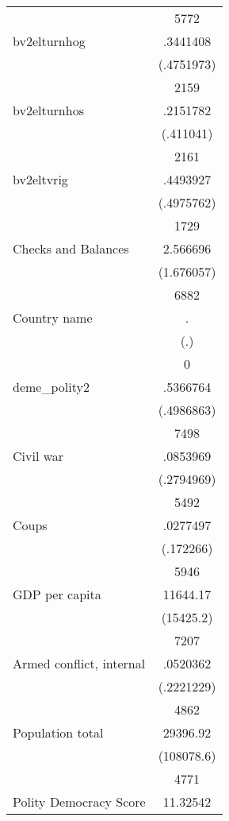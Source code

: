{\begin{longtable}{l*{1}{c}}
                    &        5772\\
bv2elturnhog        &    .3441408\\
                    &  (.4751973)\\
                    &        2159\\
bv2elturnhos        &    .2151782\\
                    &   (.411041)\\
                    &        2161\\
bv2eltvrig          &    .4493927\\
                    &  (.4975762)\\
                    &        1729\\
Checks and Balances &    2.566696\\
                    &  (1.676057)\\
                    &        6882\\
Country name        &           .\\
                    &         (.)\\
                    &           0\\
deme\_polity2        &    .5366764\\
                    &  (.4986863)\\
                    &        7498\\
Civil war           &    .0853969\\
                    &  (.2794969)\\
                    &        5492\\
Coups               &    .0277497\\
                    &   (.172266)\\
                    &        5946\\
GDP per capita      &    11644.17\\
                    &   (15425.2)\\
                    &        7207\\
Armed conflict, internal&    .0520362\\
                    &  (.2221229)\\
                    &        4862\\
Population total    &    29396.92\\
                    &  (108078.6)\\
                    &        4771\\
Polity Democracy Score&    11.32542\\

\end{longtable}}
